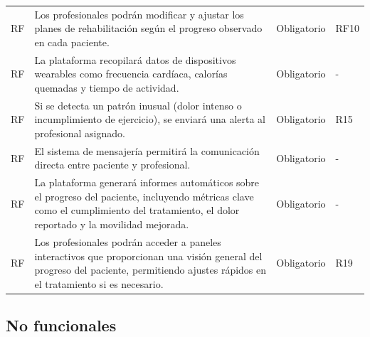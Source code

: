 \documentclass{article}
\begin{document}
\begin{longtable}{@{} p{2.5cm} p{6.5cm} p{3cm} p{3cm} @{}}
	RF\therequisitosFuncionales & Los profesionales podrán modificar y ajustar los planes de rehabilitación según el progreso observado en cada paciente. & Obligatorio & RF10 \\ 
	\addlinespace \stepcounter{requisitosFuncionales}
	RF\therequisitosFuncionales & La plataforma recopilará datos de dispositivos wearables como frecuencia cardíaca, calorías quemadas y tiempo de actividad. & Obligatorio & - \\
	\addlinespace \stepcounter{requisitosFuncionales}
	RF\therequisitosFuncionales & Si se detecta un patrón inusual (dolor intenso o incumplimiento de ejercicio), se enviará una alerta al profesional asignado. & Obligatorio & R15 \\
	\addlinespace \stepcounter{requisitosFuncionales}
	RF\therequisitosFuncionales & El sistema de mensajería permitirá la comunicación directa entre paciente y profesional. & Obligatorio & - \\
	\addlinespace \stepcounter{requisitosFuncionales}
	RF\therequisitosFuncionales & La plataforma generará informes automáticos sobre el progreso del paciente, incluyendo métricas clave como el cumplimiento del tratamiento, el dolor reportado y la movilidad mejorada. & Obligatorio & - \\
	\addlinespace \stepcounter{requisitosFuncionales}
	RF\therequisitosFuncionales & Los profesionales podrán acceder a paneles interactivos que proporcionan una visión general del progreso del paciente, permitiendo ajustes rápidos en el tratamiento si es necesario. & Obligatorio & R19 \\
	\bottomrule
\end{longtable}



\subsection{No funcionales}
\end{document}
